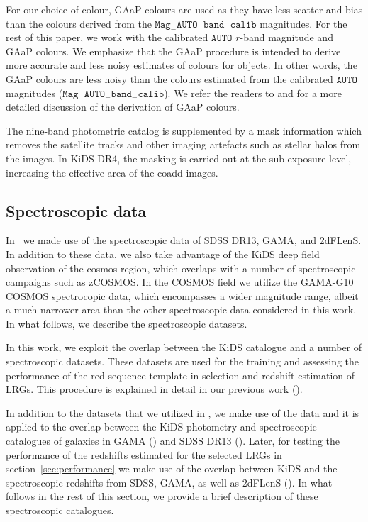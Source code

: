 \documentclass[fleqn,usenatbib,useAMS]{mnras}
\begin{document}
For our choice of colour, GAaP colours are used as they have less scatter and bias than the colours derived from the $\mathtt{Mag}_{-}\mathtt{AUTO}_{-}\mathtt{band}_{-}\mathtt{calib}$ magnitudes. For the rest of this paper, we work with the calibrated $\mathtt{AUTO}$ $r$-band magnitude and GAaP colours. We emphasize that the GAaP procedure is intended to derive more accurate and less noisy estimates of colours for objects. In other words, the GAaP colours are less noisy than the colours estimated from the calibrated $\mathtt{AUTO}$ magnitudes ($\mathtt{Mag}_{-}\mathtt{AUTO}_{-}\mathtt{band}_{-}\mathtt{calib}$). We refer the readers to \citet{kuijken2015} and \citet{kids_dr3} for a more detailed discussion of the derivation of GAaP colours.

The nine-band photometric catalog is supplemented by a mask information
which removes the satellite tracks and other imaging artefacts such as stellar halos from the images. In KiDS DR4, the masking is carried out at the sub-exposure level, increasing the effective area of the coadd images.

\subsection{Spectroscopic data}\label{sec:spec}

In~\citet{vakili2019} we made use of the spectroscopic data of SDSS DR13, GAMA, and 2dFLenS. 
In addition to these data, we also take advantage of the KiDS deep field observation of the cosmos region, which overlaps with a number of spectroscopic campaigns such as zCOSMOS. 
In the COSMOS field we utilize the GAMA-G10 COSMOS spectrocopic data, which encompasses a wider magnitude range, albeit a much narrower area than the other spectroscopic data considered in this work. In what follows, we describe the spectroscopic datasets.

In this work, we exploit the overlap between the KiDS catalogue and a number of spectroscopic datasets. These datasets are used for the training and assessing the performance of the red-sequence template in selection and redshift estimation of LRGs.  
This procedure is explained in detail in our previous work (\citealt{vakili2019}). 

In addition to the datasets that we utilized in \citet{vakili2019}, we make use of the data
and it is applied to the overlap between the KiDS photometry and spectroscopic catalogues of galaxies in GAMA (\citealt{driver2011}) and SDSS DR13 (\citealt{sdss_dr13}). Later, for testing the performance of the redshifts estimated for the selected LRGs in section~\ref{sec:performance} we make use of the overlap between KiDS and the spectroscopic redshifts from SDSS, GAMA, as well as 2dFLenS (\citealt{blake2016}).
In what follows in the rest of this section, we provide a brief description of these spectroscopic catalogues.
\end{document}
